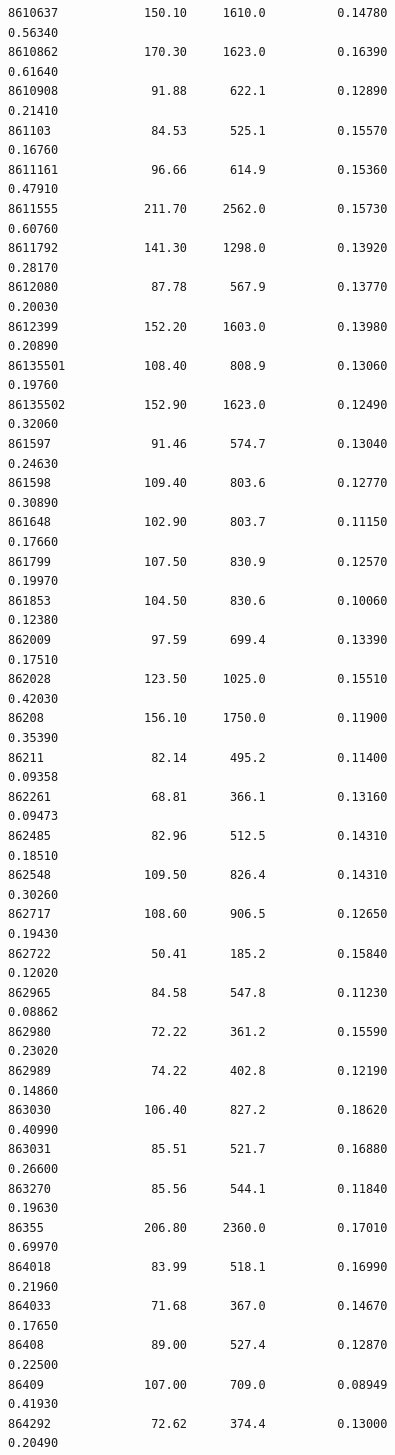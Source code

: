 \documentclass[
  letterpaper,
  DIV=11,
  numbers=noendperiod]{scrartcl}
\begin{document}
\begin{verbatim}
8610637            150.10     1610.0          0.14780           0.56340
8610862            170.30     1623.0          0.16390           0.61640
8610908             91.88      622.1          0.12890           0.21410
861103              84.53      525.1          0.15570           0.16760
8611161             96.66      614.9          0.15360           0.47910
8611555            211.70     2562.0          0.15730           0.60760
8611792            141.30     1298.0          0.13920           0.28170
8612080             87.78      567.9          0.13770           0.20030
8612399            152.20     1603.0          0.13980           0.20890
86135501           108.40      808.9          0.13060           0.19760
86135502           152.90     1623.0          0.12490           0.32060
861597              91.46      574.7          0.13040           0.24630
861598             109.40      803.6          0.12770           0.30890
861648             102.90      803.7          0.11150           0.17660
861799             107.50      830.9          0.12570           0.19970
861853             104.50      830.6          0.10060           0.12380
862009              97.59      699.4          0.13390           0.17510
862028             123.50     1025.0          0.15510           0.42030
86208              156.10     1750.0          0.11900           0.35390
86211               82.14      495.2          0.11400           0.09358
862261              68.81      366.1          0.13160           0.09473
862485              82.96      512.5          0.14310           0.18510
862548             109.50      826.4          0.14310           0.30260
862717             108.60      906.5          0.12650           0.19430
862722              50.41      185.2          0.15840           0.12020
862965              84.58      547.8          0.11230           0.08862
862980              72.22      361.2          0.15590           0.23020
862989              74.22      402.8          0.12190           0.14860
863030             106.40      827.2          0.18620           0.40990
863031              85.51      521.7          0.16880           0.26600
863270              85.56      544.1          0.11840           0.19630
86355              206.80     2360.0          0.17010           0.69970
864018              83.99      518.1          0.16990           0.21960
864033              71.68      367.0          0.14670           0.17650
86408               89.00      527.4          0.12870           0.22500
86409              107.00      709.0          0.08949           0.41930
864292              72.62      374.4          0.13000           0.20490

\end{verbatim}
\end{document}
